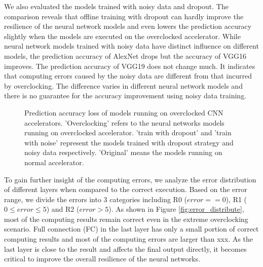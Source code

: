 We also evaluated the models trained with noisy data and dropout. 
The comparison reveals that offline training with dropout can hardly 
improve the resilience of the neural network models and even lowers the 
prediction accuracy slightly when the models are executed on the 
overclocked accelerator. While neural network models trained with 
noisy data have distinct influence on different models, the 
prediction accuracy of AlexNet drops but the accuracy of VGG16 
improves. The prediction accuracy of VGG19 does not change much.
It indicates that computing errors caused by the noisy data are 
different from that incurred by overclocking. The difference varies 
in different neural network models and there is no guarantee 
for the accuracy improvement using noisy data training.
\begin{figure}
        \center
        \qquad
        \caption{Prediction accuracy loss of models running on overclocked CNN accelerators.
			'Overclocking' refers to the neural networks models running on overclocked accelerator. 
'train with dropout' and 'train with noise' represent the models trained with dropout strategy 
and noisy data respectively. 'Original' means the models running on normal accelerator.
 }
        \label{fig:accuracy-dropout-noisy}
\end{figure}

To gain further insight of the computing errors, we analyze the error distribution 
of different layers when compared to the correct execution. Based on the error range, 
we divide the errors into 3 categories including R0 ($error == 0$), 
R1 ($0 \leq error \leq 5$) and R2 ($error > 5$). As shown in 
Figure \ref{fig:error_distribute}, most of the computing results remain 
correct even in the extreme overclocking scenario. Full connection (FC) in the last layer 
has only a small portion of correct computing results and most of the computing errors are 
larger than xxx. As the last layer is close to the result and affects the final output 
directly, it becomes critical to improve the overall resilience of the neural 
networks. 

\begin{figure*}
        \caption{Computing error distribution across the different layers}
        \label{fig:error_distribute}
\end{figure*}

